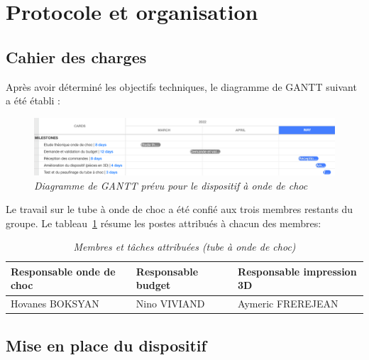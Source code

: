 \section{Protocole et organisation}
\subsection{Cahier des charges}
Après avoir déterminé les objectifs techniques, le diagramme de GANTT suivant a été établi :
\begin{figure}[H]
	\centering
	\includegraphics[scale = 0.4]{figures/gantt_choc.png}
	\caption{\small{\textit{Diagramme de GANTT prévu pour le dispositif à onde de choc}}}
	\label{fig:gantt_choc}
\end{figure}
Le travail sur le tube à onde de choc a été confié aux trois membres restants du groupe. Le tableau~\ref{tab:gestion_choc} résume les postes attribués à chacun des membres:
\begin{table}[H]
	\centering
	\begin{tabular}{|l l l|}
		\hline
		\small\textbf{Responsable onde de choc}&\small\textbf{Responsable budget}&\small\textbf{Responsable impression 3D}\\
		\hline
		\small{Hovanes BOKSYAN}&\small{Nino VIVIAND}&\small{Aymeric FREREJEAN}\\
		\hline
	\end{tabular}
	\caption{\small\textit{Membres et tâches attribuées (tube à onde de choc)}}
	\label{tab:gestion_choc}
\end{table}
\subsection{Mise en place du dispositif}
